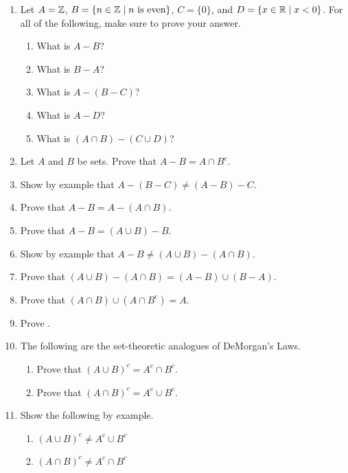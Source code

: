 \probsec{~\ref{sec:compl-set-diff}}
\begin{enumerate}
    \item Let $A = \mathbb{Z}$, $B = \{n \in \mathbb{Z} \mid n \text{ is even}\}$, $C = \{0\}$, and $D = \{x \in \mathbb{R} \mid x <0\}$. For all of the following, make sure to prove your answer.
  \begin{enumerate}
      \item What is $A - B$?
      \item What is $B - A$?
      \item What is $A - (B - C)$?
      \item What is $A - D$?
      \item What is $(A \cap B) - (C \cup D)$?
  \end{enumerate}

    \item Let $A$ and $B$ be sets. Prove that $A - B = A \cap B^c$.

    \item Show by example that $A - (B - C) \neq (A - B) - C$.

    \item Prove that $A - B = A - (A \cap B)$.

    \item Prove that $A - B = (A \cup B) - B$.

    \item Show by example that $A - B \neq (A \cup B) - (A \cap B)$.

    \item Prove that $(A \cup B) - (A \cap B) = (A - B) \cup (B - A)$.

    \item Prove that $(A \cap B) \cup (A \cap B^c) = A$.

    \item Prove .

    \item The following are the set-theoretic analogues of DeMorgan's Laws.
  \begin{enumerate}
      \item Prove that $(A \cup B)^c = A^c \cap B^c$.
      \item Prove that $(A \cap B)^c = A^c \cup B^c$.
  \end{enumerate}

    \item Show the following by example.
  \begin{enumerate}
      \item $(A \cup B)^c \neq A^c \cup B^c$ 
      \item $(A \cap B)^c \neq A^c \cap B^c$
  \end{enumerate}
\end{enumerate}
